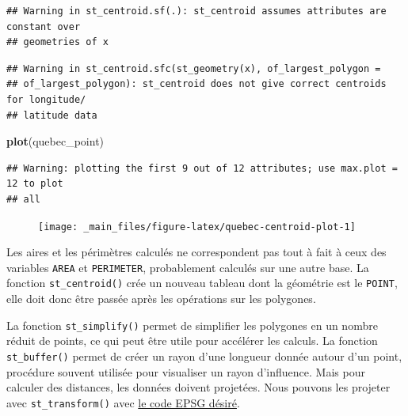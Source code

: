 \documentclass[]{book}
\newenvironment{Shaded}{\begin{snugshade}}{\end{snugshade}}
\newcommand{\DataTypeTok}[1]{\textcolor[rgb]{0.13,0.29,0.53}{#1}}
\newcommand{\KeywordTok}[1]{\textcolor[rgb]{0.13,0.29,0.53}{\textbf{#1}}}
\newcommand{\NormalTok}[1]{#1}
\newcommand{\OperatorTok}[1]{\textcolor[rgb]{0.81,0.36,0.00}{\textbf{#1}}}
\newcommand{\StringTok}[1]{\textcolor[rgb]{0.31,0.60,0.02}{#1}}
\begin{document}
\begin{Shaded}
\end{Shaded}

\begin{verbatim}
## Warning in st_centroid.sf(.): st_centroid assumes attributes are constant over
## geometries of x
\end{verbatim}

\begin{verbatim}
## Warning in st_centroid.sfc(st_geometry(x), of_largest_polygon =
## of_largest_polygon): st_centroid does not give correct centroids for longitude/
## latitude data
\end{verbatim}

\begin{Shaded}
\begin{Highlighting}[]
\KeywordTok{plot}\NormalTok{(quebec_point)}
\end{Highlighting}
\end{Shaded}

\begin{verbatim}
## Warning: plotting the first 9 out of 12 attributes; use max.plot = 12 to plot
## all
\end{verbatim}

\begin{figure}

{\centering \texttt{[image: \_main\_files/figure-latex/quebec-centroid-plot-1]} 

}

\caption{ }\label{fig:quebec-centroid-plot}
\end{figure}

Les aires et les périmètres calculés ne correspondent pas tout à fait à
ceux des variables \texttt{AREA} et \texttt{PERIMETER}, probablement
calculés sur une autre base. La fonction \texttt{st\_centroid()} crée un
nouveau tableau dont la géométrie est le \texttt{POINT}, elle doit donc
être passée après les opérations sur les polygones.

La fonction \texttt{st\_simplify()} permet de simplifier les polygones
en un nombre réduit de points, ce qui peut être utile pour accélérer les
calculs. La fonction \texttt{st\_buffer()} permet de créer un rayon
d'une longueur donnée autour d'un point, procédure souvent utilisée pour
visualiser un rayon d'influence. Mais pour calculer des distances, les
données doivent projetées. Nous pouvons les projeter avec
\texttt{st\_transform()} avec \href{https://epsg.io/3348}{le code EPSG
désiré}.
\end{document}
